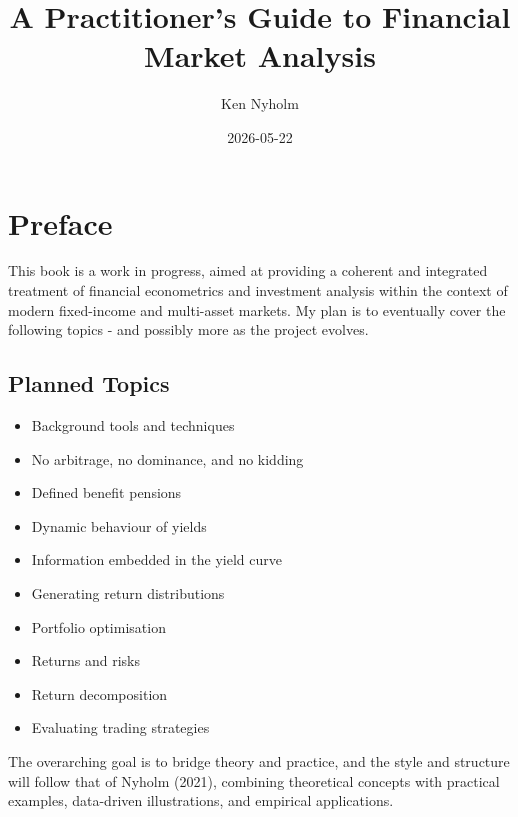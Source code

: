 \documentclass[
  letterpaper,
  DIV=11,
  numbers=noendperiod]{scrreprt}
\title{A Practitioner's Guide to Financial Market Analysis}
\author{Ken Nyholm}
\date{2026-05-22}
\providecommand{\tightlist}{%
  \setlength{\itemsep}{0pt}\setlength{\parskip}{0pt}}
\renewcommand*\contentsname{Table of contents}
\newcommand\contentsname{Table of contents}
\begin{document}
\maketitle

\renewcommand*\contentsname{Table of contents}
{
\setcounter{tocdepth}{2}
\tableofcontents
}


\chapter*{Preface}\label{preface}


This book is a work in progress, aimed at providing a coherent and
integrated treatment of financial econometrics and investment analysis
within the context of modern fixed-income and multi-asset markets. My
plan is to eventually cover the following topics - and possibly more as
the project evolves.

\section*{Planned Topics}\label{planned-topics}


\begin{itemize}
\tightlist
\item
  Background tools and techniques\\
\item
  No arbitrage, no dominance, and no kidding
\item
  Defined benefit pensions
\item
  Dynamic behaviour of yields
\item
  Information embedded in the yield curve
\item
  Generating return distributions
\item
  Portfolio optimisation
\item
  Returns and risks
\item
  Return decomposition\\
\item
  Evaluating trading strategies
\end{itemize}

The overarching goal is to bridge theory and practice, and the style and
structure will follow that of Nyholm (2021), combining theoretical
concepts with practical examples, data-driven illustrations, and
empirical applications.
\end{document}
